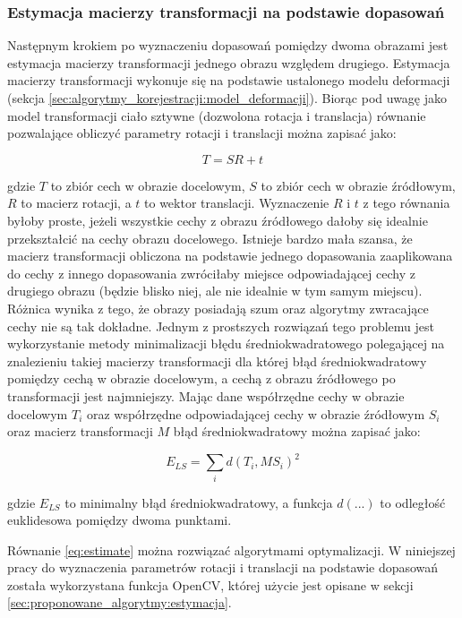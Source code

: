 \subsubsection{Estymacja macierzy transformacji na podstawie dopasowań}

Następnym krokiem po wyznaczeniu dopasowań pomiędzy dwoma obrazami jest estymacja macierzy transformacji jednego obrazu względem drugiego. Estymacja macierzy transformacji wykonuje się na podstawie ustalonego modelu deformacji (sekcja \ref{sec:algorytmy_korejestracji:model_deformacji}). Biorąc pod uwagę jako model transformacji ciało sztywne (dozwolona rotacja i translacja) równanie pozwalające obliczyć parametry rotacji i translacji można zapisać jako:

\begin{equation}
T=SR+t
\end{equation}

gdzie $T$ to zbiór cech w obrazie docelowym, $S$ to zbiór cech w obrazie źródłowym, $R$ to macierz rotacji, a $t$ to wektor translacji. Wyznaczenie $R$ i $t$ z tego równania byłoby proste, jeżeli wszystkie cechy z obrazu źródłowego dałoby się idealnie przekształcić na cechy obrazu docelowego. Istnieje bardzo mała szansa, że macierz transformacji obliczona na podstawie jednego dopasowania zaaplikowana do cechy z innego dopasowania zwróciłaby miejsce odpowiadającej cechy z drugiego obrazu (będzie blisko niej, ale nie idealnie w tym samym miejscu). Różnica wynika z tego, że obrazy posiadają szum oraz algorytmy zwracające cechy nie są tak dokładne. Jednym z prostszych rozwiązań tego problemu jest wykorzystanie metody minimalizacji błędu średniokwadratowego polegającej na znalezieniu takiej macierzy transformacji dla której błąd średniokwadratowy pomiędzy cechą w obrazie docelowym, a cechą z obrazu źródłowego po transformacji jest najmniejszy. Mając dane współrzędne cechy w obrazie docelowym $T_{i}$ oraz współrzędne odpowiadającej cechy w obrazie źródłowym $S_{i}$ oraz macierz transformacji $M$ błąd średniokwadratowy można zapisać jako:

\begin{equation}
E_{LS}=\sum_{i}d(T_{i}, MS_{i})^2
\label{eq:estimate}
\end{equation}

gdzie $E_{LS}$ to minimalny błąd średniokwadratowy, a funkcja $d(...)$ to odległość euklidesowa pomiędzy dwoma punktami.

Równanie \ref{eq:estimate} można rozwiązać algorytmami optymalizacji. W niniejszej pracy do wyznaczenia parametrów rotacji i translacji na podstawie dopasowań została wykorzystana funkcja OpenCV, której użycie jest opisane w sekcji \ref{sec:proponowane_algorytmy:estymacja}.

